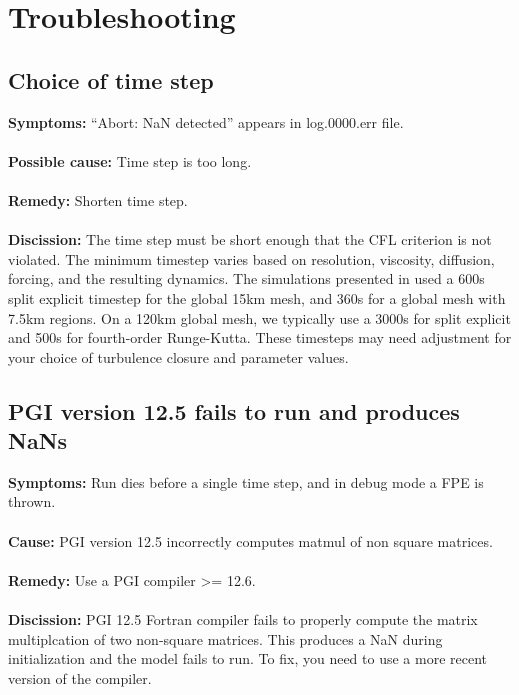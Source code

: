 \chapter{Troubleshooting}
\label{chap:troubleshooting}

\section{Choice of time step}

{\bf Symptoms:} ``Abort: NaN detected'' appears in log.0000.err file.
\\ \\
{\bf Possible cause:} Time step is too long.
\\ \\
{\bf Remedy:}  Shorten time step.  
\\ \\
{\bf Discission:}  The time step must be short enough that the CFL criterion is not violated.  The minimum timestep varies based on resolution, viscosity, diffusion, forcing, and the resulting dynamics.  The simulations presented in \citet{Ringler_ea13om} used a 600s split explicit timestep for the global 15km mesh, and 360s for a global mesh with 7.5km regions.  On a 120km global mesh, we typically use a 3000s for split explicit and 500s for fourth-order Runge-Kutta.  These timesteps may need adjustment for your choice of turbulence closure and parameter values.

\section{PGI version 12.5 fails to run and produces NaNs}

{\bf Symptoms:} Run dies before a single time step, and in debug mode a FPE is thrown.
\\ \\
{\bf Cause:} PGI version 12.5 incorrectly computes matmul of non square matrices.
\\ \\
{\bf Remedy:}  Use a PGI compiler >= 12.6.
\\ \\
{\bf Discission:}  PGI 12.5 Fortran compiler fails to properly compute the matrix multiplcation of two non-square matrices. This produces a NaN during initialization and the model fails to run. To fix, you need to use a more recent version of the compiler.




